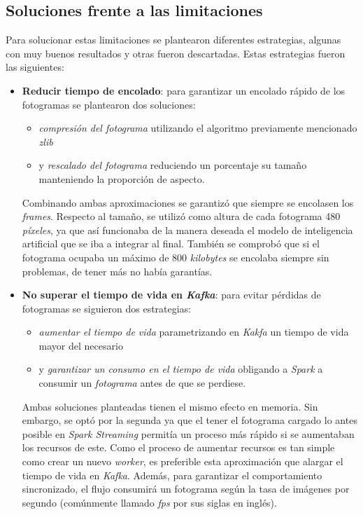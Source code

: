 \subsection{Soluciones frente a las limitaciones}

Para solucionar estas limitaciones se plantearon diferentes estrategias, algunas con muy buenos resultados y otras fueron descartadas. Estas estrategias fueron las siguientes:

\begin{itemize}
	\item \textbf{Reducir tiempo de encolado}: para garantizar un encolado rápido de los fotogramas se plantearon dos soluciones:
	\begin{itemize}
		\item \textit{compresión del fotograma} utilizando el algoritmo previamente mencionado \textit{zlib}~\cite{tool:zlib}
		\item y \textit{rescalado del fotograma} reduciendo un porcentaje su tamaño manteniendo la proporción de aspecto.
	\end{itemize}
	Combinando ambas aproximaciones se garantizó que siempre se encolasen los \textit{frames}. Respecto al tamaño, se utilizó como altura de cada fotograma 480 \textit{píxeles}, ya que así funcionaba de la manera deseada
	el modelo de inteligencia artificial que se iba a integrar al final. También se comprobó que si el fotograma ocupaba un máximo de 800 \textit{kilobytes} se encolaba siempre sin problemas, de tener más no había garantías.
	\item \textbf{No superar el tiempo de vida en \textit{Kafka}}: para evitar pérdidas de fotogramas se siguieron dos estrategias:
	\begin{itemize}
		\item \textit{aumentar el tiempo de vida} parametrizando en \textit{Kakfa} un tiempo de vida mayor del necesario
		\item y \textit{garantizar un consumo en el tiempo de vida} obligando a \textit{Spark} a consumir un \textit{fotograma} antes de que se perdiese.
	\end{itemize}
	Ambas soluciones planteadas tienen el mismo efecto en memoria. Sin embargo, se optó por la segunda ya que el tener el fotograma cargado lo antes posible en \textit{Spark Streaming} permitía un proceso más rápido si se aumentaban los recursos de este. Como el proceso de aumentar recursos es tan simple como crear un nuevo \textit{worker}, es preferible esta aproximación que alargar el tiempo de vida en \textit{Kafka}. Además, para garantizar el comportamiento sincronizado, el flujo consumirá un fotograma según la tasa de imágenes por segundo (comúnmente llamado \textit{fps} por sus siglas en inglés).

\end{itemize}
